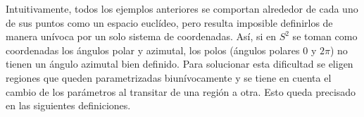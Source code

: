 \documentclass[\main/VD_completo.tex]{subfiles}
\begin{document}
Intuitivamente, todos los ejemplos anteriores se comportan alrededor de cada uno
de sus puntos como un espacio euclídeo, pero resulta imposible definirlos de
manera unívoca por un solo sistema de coordenadas. Así, si en $S^{2}$ se toman
como coordenadas los ángulos polar y azimutal, los polos (ángulos polares $0$ y
$2\pi$) no tienen un ángulo azimutal bien definido. Para solucionar esta
dificultad se eligen regiones que queden parametrizadas biunívocamente y se
tiene en cuenta el cambio de los parámetros al transitar de una región a otra.
Esto queda precisado en las siguientes definiciones.
\end{document}
